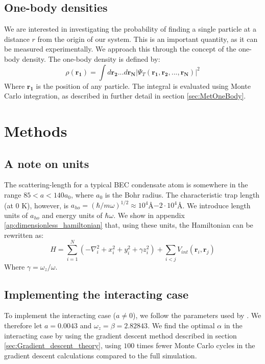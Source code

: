\documentclass[a4paper, 10pt]{article}
\begin{document}
	\subsection{One-body densities}
	We are interested in investigating the probability of finding a single particle at a distance $r$ from the origin of our system. This is an important quantity, as it can be measured experimentally. We approach this through the concept of the one-body density. The one-body density is defined by:
	\begin{equation}\label{eq:OneBodyDensity}
	\rho(\boldsymbol{r_1})=\int d\boldsymbol{r_2}...d\boldsymbol{r_N}|\Psi_T(\boldsymbol{r_1},\boldsymbol{r_2},...,\boldsymbol{r_N})|^2
	\end{equation}
	Where $\boldsymbol{r_1}$ is the position of any particle. The integral is evaluated using Monte Carlo integration, as described in further detail in section \ref{sec:MetOneBody}.
	
	
	
	
	\section{Methods}\label{Method_section}
	\subsection{A note on units}
	The scattering-length for a typical BEC condensate atom is somewhere in the range $85<a<140a_0$, where $a_0$ is the Bohr radius. The characteristic trap length (at 0 K), however, is $a_{ho}=(\hbar/m\omega)^{1/2}\approx 10^{4}$Å$-2\cdot 10^{4}$Å. We introduce length units of $a_{ho}$ and energy units of $\hbar \omega$. We show in appendix \ref{ap:dimensionless_hamiltonian} that, using these units, the Hamiltonian can be rewritten as:
	\begin{equation}\label{eq:Hamiltonian_dimensionless}
	H=\sum_{i=1}^N\left(-\nabla_i^2 + x_i^2+y_i^2+\gamma z_i^2\right)+\sum_{i<j}V_{int}(\boldsymbol{r}_i, \boldsymbol{r}_j)
	\end{equation}
	Where $\gamma=\omega_z/\omega$.
	\subsection{Implementing the interacting case}
	To implement the interacting case ($a\neq 0$), we follow the parameters used by \cite{Nilsen2005}. We therefore let $a=0.0043$ and $\omega_z=\beta=2.82843$. We find the optimal $\alpha$ in the interacting case by using the gradient descent method described in section \ref{sec:Gradient_descent_theory}, using $100$ times fewer Monte Carlo cycles in the gradient descent calculations compared to the full simulation.
\end{document}
